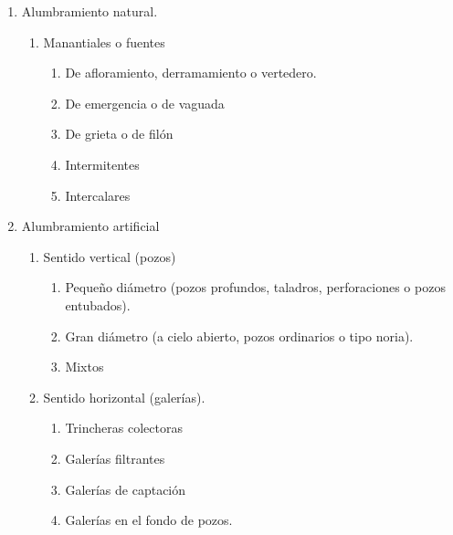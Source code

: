 \begin{enumerate}
	\item Alumbramiento natural.
	      \begin{enumerate}
		      \item  Manantiales o fuentes
		            \begin{enumerate}
			            \item De afloramiento, derramamiento o vertedero.
			            \item De emergencia o de vaguada
			            \item De grieta o de filón
			            \item Intermitentes
			            \item  Intercalares
		            \end{enumerate}
	      \end{enumerate}
	\item Alumbramiento artificial
	      \begin{enumerate}
		      \item  Sentido vertical (pozos)
		            \begin{enumerate}
			            \item Pequeño diámetro (pozos profundos, taladros, perforaciones o
			                  pozos entubados).
			            \item Gran diámetro (a cielo abierto, pozos ordinarios o tipo noria).
			            \item Mixtos
		            \end{enumerate}
		      \item  Sentido horizontal (galerías).
		            \begin{enumerate}
			            \item Trincheras colectoras
			            \item Galerías filtrantes
			            \item Galerías de captación
			            \item Galerías en el fondo de pozos.
		            \end{enumerate}
	      \end{enumerate}
\end{enumerate}

